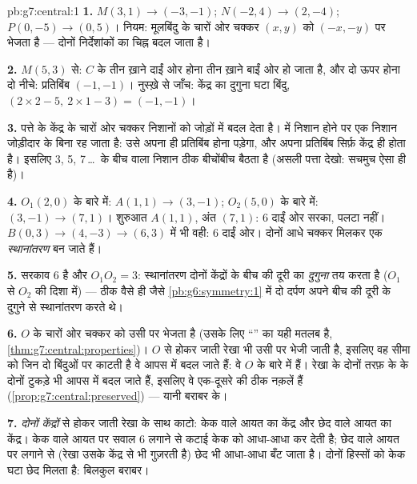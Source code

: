 \begin{solution}{pb:g7:central:1}
\textbf{1.} $M(3, 1) \to (-3, -1)$; $N(-2, 4) \to (2, -4)$;
$P(0, -5) \to (0, 5)$। नियम: मूलबिंदु के चारों ओर  चक्कर
$(x, y)$ को $(-x, -y)$ पर भेजता है --- दोनों निर्देशांकों का चिह्न
बदल जाता है।

\textbf{2.} $M(5, 3)$ से: $C$ के तीन ख़ाने दाईं ओर होना तीन ख़ाने
बाईं ओर हो जाता है, और दो ऊपर होना दो नीचे: प्रतिबिंब
$(-1, -1)$। नुस्ख़े से जाँच: केंद्र का दुगुना घटा बिंदु,
$(2 \times 2 - 5,\ 2 \times 1 - 3) = (-1, -1)$।

\textbf{3.} पत्ते के केंद्र के चारों ओर  चक्कर निशानों को
जोड़ों में बदल देता है।  में निशान होने पर एक निशान
जोड़ीदार के बिना रह जाता है: उसे अपना ही प्रतिबिंब होना पड़ेगा, और
अपना प्रतिबिंब सिर्फ़ केंद्र ही होता है। इसलिए 3, 5, 7\,\dots\ के
बीच वाला निशान ठीक बीचोंबीच बैठता है (असली पत्ता देखो: सचमुच ऐसा
ही है)।

\textbf{4.} $O_1(2,0)$ के बारे में: $A(1,1) \to (3,-1)$;
$O_2(5,0)$ के बारे में: $(3,-1) \to (7,1)$। शुरुआत $A(1,1)$, अंत
$(7,1)$: $6$ दाईं ओर सरका, पलटा नहीं। $B(0,3) \to (4,-3) \to
(6,3)$ में भी वही: $6$ दाईं ओर। दोनों आधे चक्कर मिलकर एक
\emph{स्थानांतरण} बन जाते हैं।

\textbf{5.} सरकाव $6$ है और $O_1 O_2 = 3$: स्थानांतरण दोनों
केंद्रों के बीच की दूरी का \emph{दुगुना} तय करता है ($O_1$ से
$O_2$ की दिशा में) --- ठीक वैसे ही जैसे
\cref{pb:g6:symmetry:1} में दो  दर्पण अपने बीच की दूरी के
दुगुने से स्थानांतरण करते थे।

\textbf{6.} $O$ के चारों ओर  चक्कर  को उसी पर
भेजता है (उसके लिए ``'' का यही मतलब है,
\cref{thm:g7:central:properties})। $O$ से होकर जाती रेखा भी उसी पर
भेजी जाती है, इसलिए वह सीमा को जिन दो बिंदुओं पर काटती है वे आपस
में बदल जाते हैं: वे $O$ के बारे में  हैं। रेखा के दोनों तरफ़
के  के दोनों टुकड़े भी आपस में बदल जाते हैं, इसलिए
वे एक-दूसरे की ठीक नक़लें हैं (\cref{prop:g7:central:preserved})
--- यानी बराबर  के।

\textbf{7.} \emph{दोनों केंद्रों} से होकर जाती रेखा के साथ काटो:
केक वाले आयत का केंद्र और छेद वाले आयत का केंद्र। केक वाले आयत पर
सवाल 6 लगाने से कटाई केक को आधा-आधा कर देती है; छेद वाले आयत पर
लगाने से (रेखा उसके केंद्र से भी गुज़रती है) छेद भी आधा-आधा बँट
जाता है। दोनों हिस्सों को  केक घटा  छेद मिलता है: बिलकुल
बराबर।


\end{solution}
